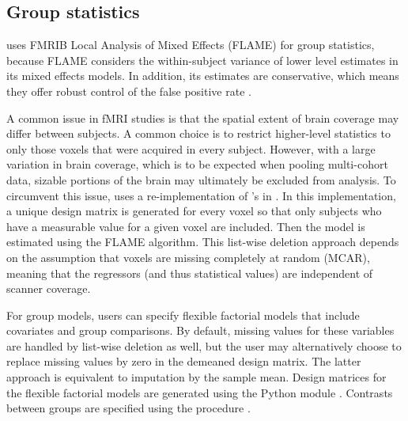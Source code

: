 \subsection{Group statistics}\label{sec:statistics}

 uses  FMRIB Local Analysis of Mixed Effects (FLAME) \parencite{woolrich2004} for group statistics, because FLAME considers the within-subject variance of lower level estimates in its mixed effects models. In addition, its estimates are conservative, which means they offer robust control of the false positive rate \parencite{eklund2016}.

A common issue in fMRI studies is that the spatial extent of brain coverage may differ between subjects. A common choice is to restrict higher-level statistics to only those voxels that were acquired in every subject. However, with a large variation in brain coverage, which is to be expected when pooling multi-cohort data, sizable portions of the brain may ultimately be excluded from analysis. To circumvent this issue,  uses a re-implementation of 's  in  \parencite{harris2020}. In this implementation, a unique design matrix is generated for every voxel so that only subjects who have a measurable value for a given voxel are included. Then the model is estimated using the FLAME algorithm. This list-wise deletion approach depends on the assumption that voxels are missing completely at random (MCAR), meaning that the regressors (and thus statistical values) are independent of scanner coverage.

For group models, users can specify flexible factorial models that include covariates and group comparisons. By default, missing values for these variables are handled by list-wise deletion as well, but the user may alternatively choose to replace missing values by zero in the demeaned design matrix. The latter approach is equivalent to imputation by the sample mean. Design matrices for the flexible factorial models are generated using the Python module  \parencite{smith2018}. Contrasts between groups are specified using the  procedure \parencite{lenth2016}.
